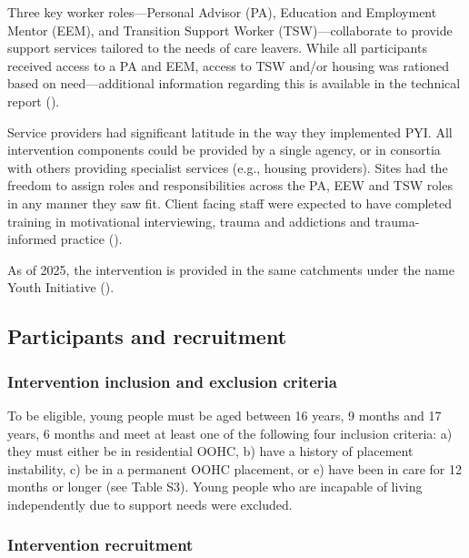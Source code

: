 \documentclass[
  jou,
  floatsintext,
  longtable,
  nolmodern,
  notxfonts,
  notimes,
  colorlinks=true,linkcolor=blue,citecolor=blue,urlcolor=blue]{apa7}
\begin{document}
Three key worker roles---Personal Advisor (PA), Education and Employment
Mentor (EEM), and Transition Support Worker (TSW)---collaborate to
provide support services tailored to the needs of care leavers. While
all participants received access to a PA and EEM, access to TSW and/or
housing was rationed based on need---additional information regarding
this is available in the technical report
().

Service providers had significant latitude in the way they implemented
PYI. All intervention components could be provided by a single agency,
or in consortia with others providing specialist services (e.g., housing
providers). Sites had the freedom to assign roles and responsibilities
across the PA, EEW and TSW roles in any manner they saw fit. Client
facing staff were expected to have completed training in motivational
interviewing, trauma and addictions and trauma-informed practice
().

As of 2025, the intervention is provided in the same catchments under
the name Youth Initiative
().

\subsection{Participants and
recruitment}\label{participants-and-recruitment}

\subsubsection{Intervention inclusion and exclusion
criteria}\label{intervention-inclusion-and-exclusion-criteria}

To be eligible, young people must be aged between 16 years, 9 months and
17 years, 6 months and meet at least one of the following four inclusion
criteria: a) they must either be in residential OOHC, b) have a history
of placement instability, c) be in a permanent OOHC placement, or e)
have been in care for 12 months or longer (see Table S3). Young people
who are incapable of living independently due to support needs were
excluded.

\subsubsection{Intervention recruitment}\label{intervention-recruitment}
\end{document}
